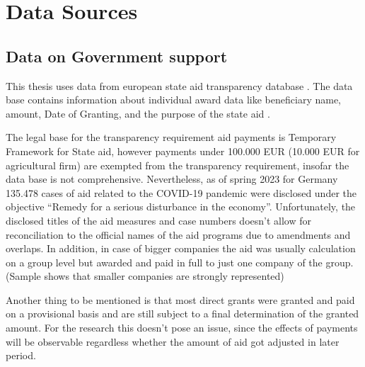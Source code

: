 
\chapter{Data Sources} %

\label{Chapter3} %


\section{Data on Government support}

This thesis uses data from european state aid transparency database \parencite{eu_com_state_2023}. 
The data base contains information about individual award data like beneficiary name, amount, Date of Granting, and the purpose of the state aid \parencite{eu_com_state_2023}. 

The legal base for the transparency requirement aid payments is Temporary Framework for State aid, however payments under 100.000 EUR (10.000 EUR for agricultural firm) are exempted from the transparency requirement, insofar the data base is not comprehensive. Nevertheless, as of spring 2023 for Germany 135.478 cases of aid related to the COVID-19 pandemic were disclosed under the objective “Remedy for a serious disturbance in the economy”. Unfortunately, the disclosed titles of the aid measures and case numbers doesn't allow for reconciliation to the official names of the aid programs due to amendments and overlaps. In addition, in case of bigger companies the aid was usually calculation on a group level but awarded and paid in full to just one company of the group. (Sample shows that smaller companies are strongly represented)

Another thing to be mentioned is that most direct grants were granted and paid on a provisional basis and are still subject to a final determination of the granted amount. For the research this doesn’t pose an issue, since the effects of payments will be observable regardless whether the amount of aid got adjusted in later period. 







